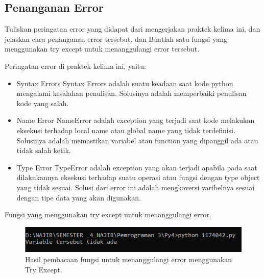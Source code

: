 \subsection{Penanganan Error}
Tuliskan  peringatan  error  yang  didapat  dari  mengerjakan  praktek  kelima  ini, dan  jelaskan  cara  penanganan  error  tersebut.   dan  Buatlah  satu  fungsi  yang menggunakan try except untuk menanggulangi error tersebut.

\hfill \break
Peringatan error di praktek kelima ini, yaitu:
\begin{itemize}
	\item Syntax Errors
	Syntax Errors adalah suatu keadaan saat kode python mengalami kesalahan penulisan. Solusinya adalah memperbaiki penulisan kode yang salah.
	
	\item Name Error
	NameError adalah exception yang terjadi saat kode melakukan eksekusi terhadap local name atau global name yang tidak terdefinisi. Solusinya adalah memastikan variabel atau function yang dipanggil ada atau tidak salah ketik.
	
	\item Type Error
	TypeError adalah exception yang akan terjadi apabila pada saat dilakukannya eksekusi terhadap suatu operasi atau fungsi dengan type object yang tidak sesuai. Solusi dari error ini adalah mengkoversi varibelnya sesuai dengan tipe data yang akan digunakan.
\end{itemize}

\hfill \break
Fungsi yang menggunakan try except untuk menanggulangi error.



\begin{figure}[H]
	\includegraphics[width=12cm]{figures/5/1174042/Praktek/5.png}
	\centering
	\caption{Hasil pembacaan fungsi untuk menanggulangi error menggunakan Try Except.}
\end{figure}